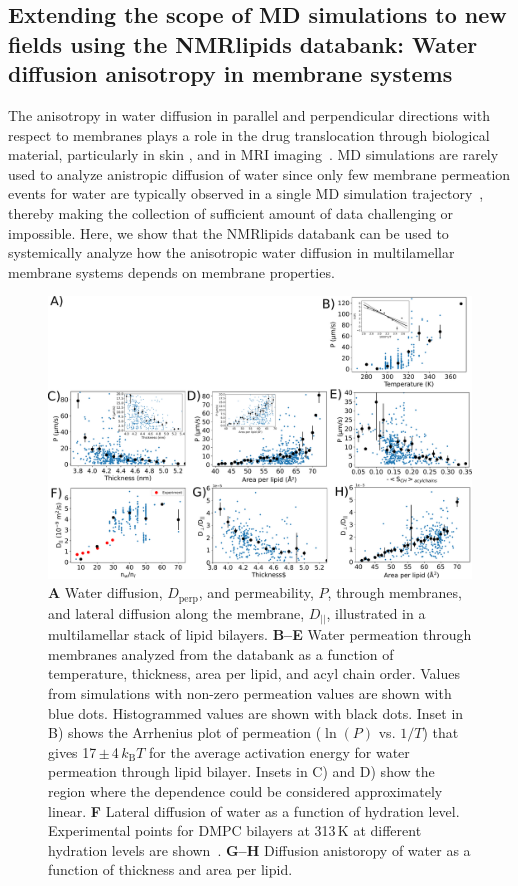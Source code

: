 \documentclass[fleqn,10pt]{wlscirep}
\begin{document}
\subsection{Extending the scope of MD simulations to new fields using the NMRlipids databank: Water diffusion anisotropy in membrane systems}
The anisotropy in water diffusion in parallel and perpendicular directions with respect to membranes plays a role in the drug translocation through biological material, particularly in skin \cite{hansen13,wen18,nitsche19,roberts21}, and in MRI imaging~\cite{topgaard20}. MD simulations are rarely used to analyze anistropic diffusion of water since only few membrane permeation events for water are typically observed in a single MD simulation trajectory~\cite{venable19,camilo2022}, thereby making the collection of sufficient amount of data challenging or impossible. Here, we show that the NMRlipids databank can be used to systemically analyze how the anisotropic water diffusion in multilamellar membrane systems depends on membrane properties. 

\begin{figure}[tb]
    \centering
    \includegraphics[width=\linewidth]{Figures/permeation2.pdf}
    \caption{\textbf{A} Water diffusion, $D_\mathrm{perp}$, and permeability, $P$, through membranes, and lateral diffusion along the membrane, $D_{||}$, illustrated in a multilamellar stack of lipid bilayers. 
    \textbf{B--E} Water permeation through membranes analyzed from the databank as a function of temperature, thickness, area per lipid, and acyl chain order. Values from simulations with non-zero permeation values are shown with blue dots. Histogrammed values are shown with black dots. Inset in B) shows the Arrhenius plot of permeation ($\ln(P)$ vs. $1/T$) that gives 17\,$\pm$\,4\,$k_\mathrm{B}T$ for the average activation energy for water permeation through lipid bilayer. Insets in C) and D) show the region where the dependence could be considered approximately linear.
    \textbf{F} Lateral diffusion of water as a function of hydration level. Experimental points for DMPC bilayers at 313\,K at different hydration levels are shown~\cite{rudakova04}.
    \textbf{G--H} Diffusion anistoropy of water as a function of thickness and area per lipid. }
    \label{fig:permeability}
\end{figure}
\end{document}
